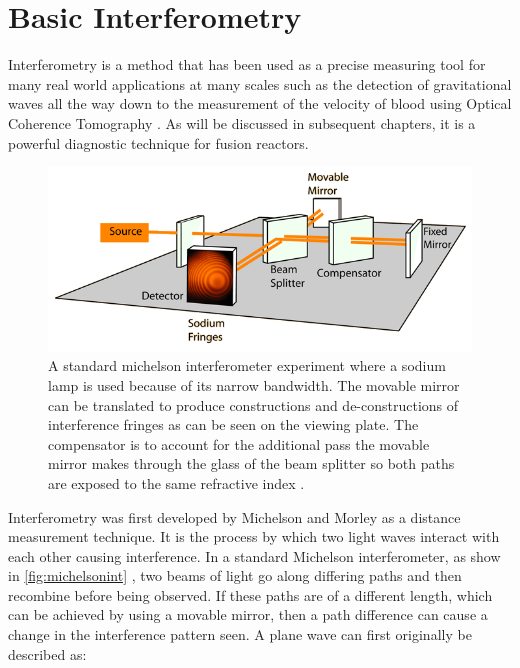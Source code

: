 \documentclass[12pt,a4paper,oneside]{report}
\begin{document}
	\section{Basic Interferometry}
Interferometry is a method that has been used as a precise measuring tool for many real world applications at many scales such as the detection of gravitational waves \cite{AbbottObservationMerger} all the way down to the measurement of the velocity of blood using Optical Coherence Tomography \cite{Zhao2000Phase-resolvedSensitivity}. As will be discussed in subsequent chapters, it is a powerful diagnostic technique for fusion reactors.
\begin{figure}[H]
\includegraphics[width=1\textwidth, center,angle=0]{Images/michelsonint.png}
\caption{A standard michelson interferometer experiment where a sodium lamp is used because of its narrow bandwidth. The movable mirror can be translated to produce constructions and de-constructions of interference fringes as can be seen on the viewing plate. The compensator is to account for the additional pass the movable mirror makes through the glass of the beam splitter so both paths are exposed to the same refractive index \cite{Michelsonimage}.}
\label{fig:michelsonint}
\end{figure}

Interferometry was first developed by Michelson and Morley \cite{Michelson1887RelativeEther} as a distance measurement technique. It is the process by which two light waves interact with each other causing interference. In a standard Michelson interferometer, as show in \autoref{fig:michelsonint} , two beams of light go along differing paths and then recombine before being observed. If these paths are of a different length, which can be achieved by using a movable mirror, then a path difference can cause a change in the interference pattern seen. A plane wave can first originally be described as: 
\end{document}

